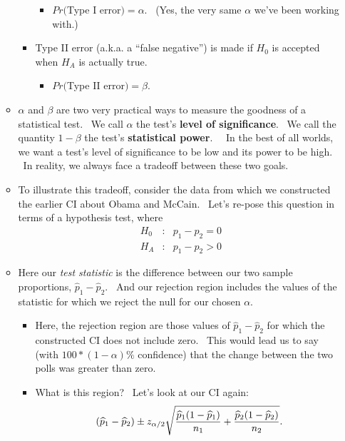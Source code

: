 \documentclass[11pt]{article}
\begin{document}
\begin{itemize}
\begin{itemize}
\begin{itemize}
\begin{itemize}
\item $Pr($Type I error$)=\alpha .$ \ (Yes, the very same $\alpha $ we've
been working with.)
\end{itemize}

\item Type II error (a.k.a. a \textquotedblleft false
negative\textquotedblright ) is made if $H_{0}$ is accepted when $H_{A}$ is
actually true.

\begin{itemize}
\item $Pr($Type II error$)=\beta .$ \ 
\end{itemize}
\end{itemize}

\item $\alpha $ and $\beta $ are two very practical ways to measure the
goodness of a statistical test. \ We call $\alpha $ the test's \textbf{level
of significance}. \ We call the quantity $1-\beta $ the test's \textbf{%
statistical power}. \ \ In the best of all worlds, we want a test's level of
significance to be low and its power to be high. \ In reality, we always
face a tradeoff between these two goals.

\item To illustrate this tradeoff, consider the data from which we
constructed the earlier CI about Obama and McCain. \ Let's re-pose this
question in terms of a hypothesis test, where%
\begin{eqnarray*}
H_{0} &:&p_{1}-p_{2}=0 \\
H_{A} &:&p_{1}-p_{2}>0
\end{eqnarray*}

\item Here our \textit{test statistic }is the difference between our two
sample proportions, $\widehat{p}_{1}-\widehat{p}_{2}.$ \ And our rejection
region includes the values of the statistic for which we reject the null for
our chosen $\alpha .$

\begin{itemize}
\item Here, the rejection region are those values of $\widehat{p}_{1}-%
\widehat{p}_{2}$ for which the constructed CI does not include zero. \ This
would lead us to say (with $100\ast (1-\alpha )\%$ confidence) that the
change between the two polls was greater than zero. \ 

\item What is this region? \ Let's look at our CI again:%
\begin{equation*}
\left( \widehat{p}_{1}-\widehat{p}_{2}\right) \pm z_{\alpha /2}\sqrt{\frac{%
\widehat{p}_{1}(1-\widehat{p}_{1})}{n_{1}}+\frac{\widehat{p}_{2}(1-\widehat{p%
}_{2})}{n_{2}}}.
\end{equation*}


\end{itemize}
\end{itemize}
\end{itemize}
\end{document}
